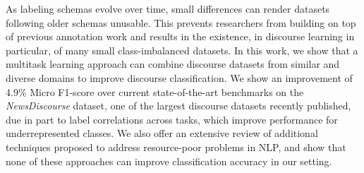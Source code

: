 As labeling schemas evolve over time, small differences can render datasets following older schemas unusable. This prevents researchers from building on top of previous annotation work and results in the existence, in discourse learning in particular, of many small class-imbalanced datasets. In this work, we show that a multitask learning approach can combine discourse datasets from similar and diverse domains to improve discourse classification. We show an improvement of 4.9\% Micro F1-score over current state-of-the-art benchmarks on the \textit{NewsDiscourse} dataset, one of the largest discourse datasets recently published, due in part to label correlations across tasks, which improve performance for underrepresented classes. We also offer an extensive review of additional techniques proposed to address resource-poor problems in NLP, and show that none of these approaches can improve classification accuracy in our setting.
